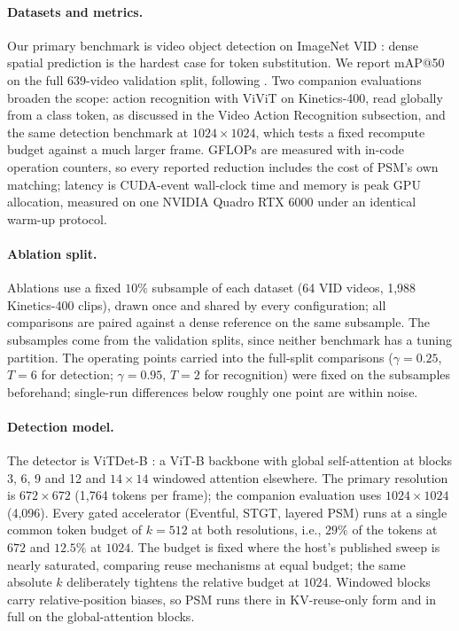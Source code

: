 \documentclass[letterpaper]{article}
\begin{document}
\paragraph{Datasets and metrics.}
Our primary benchmark is video object detection on ImageNet VID
\cite{imagenetvid}: dense
spatial prediction is the hardest case for token substitution. We
report mAP@50 on the full 639-video validation split, following
\cite{eventful,maskvd}. Two companion evaluations broaden the scope:
action recognition with ViViT on Kinetics-400, read
globally from a class token, as discussed in the Video Action Recognition
subsection, and
the same detection benchmark at $1024 \times 1024$, which tests a fixed
recompute budget against a much larger frame. GFLOPs are measured with in-code operation counters, so every
reported reduction includes the cost of PSM's own matching; latency is CUDA-event
wall-clock time and memory is peak GPU allocation, measured on one
NVIDIA Quadro RTX 6000 under an identical warm-up protocol.

\paragraph{Ablation split.}
Ablations use a fixed $10\%$ subsample of each dataset (64 VID videos,
1{,}988 Kinetics-400 clips), drawn once and shared by every
configuration; all comparisons are paired against a dense reference on
the same subsample. The subsamples come from the validation
splits, since neither benchmark has a tuning partition. The operating points carried into the full-split
comparisons ($\gamma = 0.25$, $T = 6$ for detection; $\gamma = 0.95$,
$T = 2$ for recognition) were fixed on the subsamples beforehand;
single-run differences below roughly one point are within noise.

\paragraph{Detection model.}
The detector is ViTDet-B \cite{vitdet}: a ViT-B backbone \cite{vit}
with global self-attention at blocks 3, 6, 9 and 12 and
$14 \times 14$ windowed attention elsewhere. The primary resolution is
$672 \times 672$ (1{,}764 tokens per frame); the companion evaluation
uses $1024 \times 1024$ (4{,}096). Every gated accelerator (Eventful,
STGT, layered PSM) runs at a single common token budget of $k = 512$
at both resolutions, i.e., $29\%$ of the tokens at $672$ and $12.5\%$
at $1024$. The budget is fixed where the host's published
sweep is nearly saturated, comparing reuse mechanisms at equal budget;
the same absolute $k$ deliberately tightens the relative budget at
$1024$. Windowed blocks carry
relative-position biases, so PSM runs there in KV-reuse-only form and
in full on the global-attention blocks.
\end{document}
